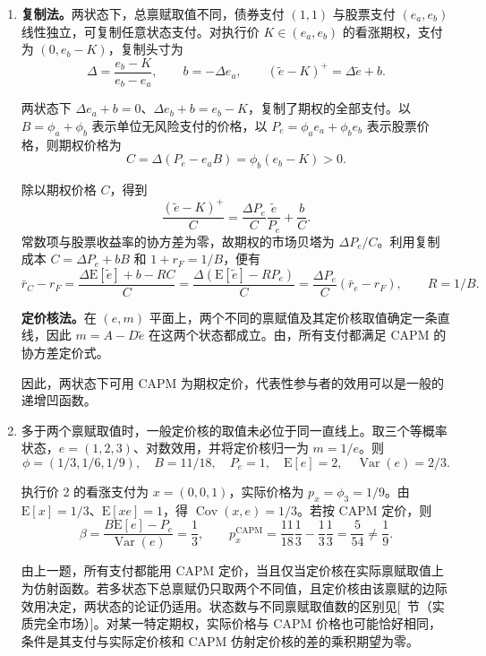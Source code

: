 \begin{solution}[blank-type=manual,blank-vsep=9\baselineskip]
\begin{enumerate}[label=(\alph*)]
\item \textbf{复制法。}两状态下，总禀赋取值不同，债券支付 $(1,1)$ 与股票支付 $(e_a,e_b)$ 线性独立，可复制任意状态支付。对执行价 $K\in(e_a,e_b)$ 的看涨期权，支付为 $(0,e_b-K)$，复制头寸为
\[
 \Delta=\frac{e_b-K}{e_b-e_a},\qquad b=-\Delta e_a,
 \qquad (\widetilde e-K)^+=\Delta\widetilde e+b.
\]

两状态下 $\Delta e_a+b=0$、$\Delta e_b+b=e_b-K$，复制了期权的全部支付。以 $B=\phi_a+\phi_b$ 表示单位无风险支付的价格，以 $P_e=\phi_a e_a+\phi_b e_b$ 表示股票价格，则期权价格为
\[
 \boxed{C=\Delta(P_e-e_aB)=\phi_b(e_b-K)>0}.
\]

除以期权价格 $C$，得到
\[
 \frac{(\widetilde e-K)^+}{C}
 =\frac{\Delta P_e}{C}\frac{\widetilde e}{P_e}+\frac bC.
\]
常数项与股票收益率的协方差为零，故期权的市场贝塔为 $\Delta P_e/C$。利用复制成本 $C=\Delta P_e+bB$ 和 $1+r_F=1/B$，便有
\[
 \bar r_C-r_F
 =\frac{\Delta\mathrm E[\widetilde e]+b-RC}{C}
 =\frac{\Delta(\mathrm E[\widetilde e]-RP_e)}{C}
 =\frac{\Delta P_e}{C}(\bar r_e-r_F),\qquad R=1/B.
\]

\textbf{定价核法。}在 $(e,m)$ 平面上，两个不同的禀赋值及其定价核取值确定一条直线，因此 $m=A-D\widetilde e$ 在这两个状态都成立。由，所有支付都满足 CAPM 的协方差定价式。

因此，两状态下可用 CAPM 为期权定价，代表性参与者的效用可以是一般的递增凹函数。

\item 多于两个禀赋取值时，一般定价核的取值未必位于同一直线上。取三个等概率状态，$e=(1,2,3)$、对数效用，并将定价核归一为 $m=1/e$。则
\[
 \phi=(1/3,1/6,1/9),\quad B=11/18,\quad P_e=1,
 \quad\mathrm E[e]=2,\quad\operatorname{Var}(e)=2/3.
\]

执行价 2 的看涨支付为 $x=(0,0,1)$，实际价格为 $p_x=\phi_3=1/9$。由 $\mathrm E[x]=1/3$、$\mathrm E[xe]=1$，得 $\operatorname{Cov}(x,e)=1/3$。若按 CAPM 定价，则
\[
 \beta=\frac{B\mathrm E[e]-P_e}{\operatorname{Var}(e)}=\frac13,
 \qquad
 p_x^{\mathrm{CAPM}}=\frac{11}{18}\frac13-\frac13\frac13=\frac5{54}\ne\frac19.
\]

由上一题，所有支付都能用 CAPM 定价，当且仅当定价核在实际禀赋取值上为仿射函数。若多状态下总禀赋仍只取两个不同值，且定价核由该禀赋的边际效用决定，两状态的论证仍适用\ifdefined\WJHandoutKnowledge。状态数与不同禀赋取值数的区别见[~节（实质完全市场）]\fi。对某一特定期权，实际价格与 CAPM 价格也可能恰好相同，条件是其支付与实际定价核和 CAPM 仿射定价核的差的乘积期望为零。\qedhere
\end{enumerate}
\end{solution}

